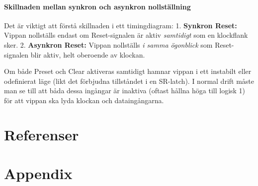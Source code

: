 \documentclass[
  swedish,
  letterpaper,
  oneside,
  openany]{book}
\begin{document}
\subsubsection{Skillnaden mellan synkron och asynkron
nollställning}\label{skillnaden-mellan-synkron-och-asynkron-nollstuxe4llning}

Det är viktigt att förstå skillnaden i ett timingdiagram: 1.
\textbf{Synkron Reset:} Vippan nollställs endast om Reset-signalen är
aktiv \emph{samtidigt} som en klockflank sker. 2. \textbf{Asynkron
Reset:} Vippan nollställs \emph{i samma ögonblick} som Reset-signalen
blir aktiv, helt oberoende av klockan.

\begin{tcolorbox}[enhanced jigsaw, arc=.35mm, bottomrule=.15mm, bottomtitle=1mm, breakable, colback=white, colbacktitle=quarto-callout-warning-color!10!white, colframe=quarto-callout-warning-color-frame, coltitle=black, left=2mm, leftrule=.75mm, opacityback=0, opacitybacktitle=0.6, rightrule=.15mm, title=\textcolor{quarto-callout-warning-color}{\faExclamationTriangle}\hspace{0.5em}{Prioritetsfällan}, titlerule=0mm, toprule=.15mm, toptitle=1mm]

Om både Preset och Clear aktiveras samtidigt hamnar vippan i ett
instabilt eller odefinierat läge (likt det förbjudna tillståndet i en
SR-latch). I normal drift måste man se till att båda dessa ingångar är
inaktiva (oftast hållna höga till logisk 1) för att vippan ska lyda
klockan och dataingångarna.

\end{tcolorbox}


\chapter*{Referenser}\label{referenser}


\protect{}\label{refs}


\chapter*{Appendix}\label{appendix}

\end{document}
